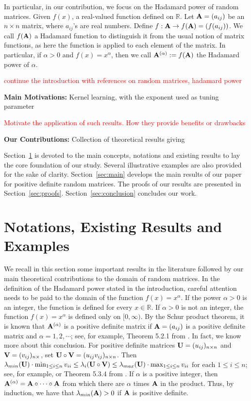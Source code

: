 \documentclass[conference,letterpaper]{IEEEtran}
\numberwithin{equation}{section}
\newcommand{\lbl}{\label}
\newcommand{\bd}{\bold}
\begin{document}
In particular, in our contribution, we focus on the Hadamard power of random matrices. 
Given $f(x)$, a real-valued function defined on $\mathbb{R}.$ Let $\bd{A}=(a_{ij})$ be an $n\times n$ matrix, where $a_{ij}$'s are real numbers.  Define $f: \bd{A} \rightarrow f(\bd{A)}=(f(a_{i j}))$. We call $f(\bd{A})$  a Hadamard function to distinguish it from the usual notion of matrix functions, as here the function is applied to each element of the matrix. 
In particular, if $\alpha>0$ and  $f(x)=x^{\alpha}$, then we call  $\bd{A}^{(\alpha)}:=f(\bd{A})$ the Hadamard power of $\alpha$. 

\textcolor{red}{continue the introduction with references on random matrices, hadamard power}

\textbf{Main Motivations: }
Kernel learning, with the exponent used as tuning parameter

\textcolor{red}{Motivate the application of such results. How they provide benefits or drawbacks}

\textbf{Our Contributions: }
Collection of theoretical results giving 


Section~\ref{sec:notations} is devoted to the main concepts, notations and existing results to lay the core foundation of our study.
Several illustrative examples are also provided for the sake of clarity.
Section~\ref{sec:main} develops the main results of our paper for positive definite random matrices.
The proofs of our results are presented in Section~\ref{sec:proofs}.
Section~\ref{sec:conclusion} concludes our work.

\section{Notations, Existing Results and Examples}\lbl{sec:notations}
We recall in this section some important results in the literature followed by our main theoretical contributions to the domain of random matrices.
In the definition of the Hadamard power stated in the introduction, careful attention needs to be paid to the domain of the function $f(x)=x^{\alpha}$. 
If the power $\alpha>0$ is an integer, the function is defined for every $x\in \mathbb{R}.$ If $\alpha>0$ is not an integer, the function $f(x)=x^{\alpha}$ is defined only on $[0, \infty).$ By the Schur product theorem, it is known that $\bd{A}^{(\alpha)}$ is a positive definite matrix if $\bd{A}=(a_{ij})$ is a positive definite matrix and $\alpha =1,2, \cdots$; see, for example, Theorem 5.2.1 from \cite{horn_johnson_1991}. In fact, we know more about this conclusion. For positive definite matrices $\bd{U}=(u_{ij})_{n\times n}$ and $\bd{V}=(v_{ij})_{n\times}$, set $\bd{U}\circ \bd{V}=(u_{ij}v_{ij})_{n\times n}$. Then  $\lambda_{min}(\bd{U})\cdot\min_{1\leq i \leq n}{v_{ii}}\leq \lambda_i(\bd{U}\circ \bd{V})\leq \lambda_{max}(\bd{U})\cdot\max_{1\leq i \leq n}{v_{ii}}$ for each $1\leq i \leq n$; see, for example, \cite{schur1911bemerkungen} or Theorem 5.3.4 from \cite{horn_johnson_1991}. If $\alpha$ is a positive integer, then  $\bd{A}^{(\alpha)}=\bd{A}\circ\cdots\circ\bd{A}$ from which there are $\alpha$ times $\bd{A}$ in the product. Thus, by induction, we have that $\lambda_{min}(\bd{A})>0$ if $\bd{A}$ is positive definite.
\end{document}
